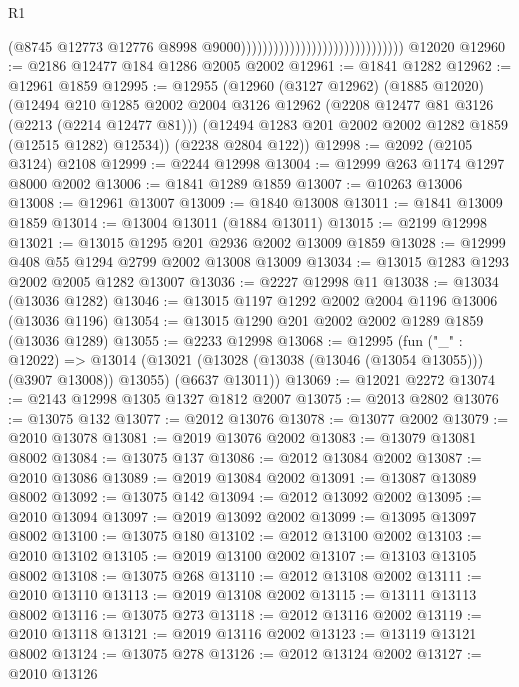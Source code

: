 \begin{lexlean}{R1}
\begin{coremodule}
                                                              (@8745
                                                                @12773
                                                                @12776
                                                                @8998
                                                                @9000))))))))))))))))))))))))))))))
    @12020
@12960 := @2186 @12477 @184 @1286 @2005 @2002
@12961 := @1841 @1282
@12962 := @12961 @1859
@12995 := @12955
    (@12960
      (@3127 @12962)
      (@1885 @12020)
      (@12494
        @210
        @1285
        @2002
        @2004
        @3126
        @12962
        (@2208 @12477 @81 @3126 (@2213 (@2214 @12477 @81)))
        (@12494 @1283 @201 @2002 @2002 @1282 @1859 (@12515 @1282) @12534))
      (@2238 @2804 @122))
@12998 := @2092 (@2105 @3124) @2108
@12999 := @2244 @12998
@13004 := @12999 @263 @1174 @1297 @8000 @2002
@13006 := @1841 @1289 @1859
@13007 := @10263 @13006
@13008 := @12961 @13007
@13009 := @1840 @13008
@13011 := @1841 @13009 @1859
@13014 := @13004 @13011 (@1884 @13011)
@13015 := @2199 @12998
@13021 := @13015 @1295 @201 @2936 @2002 @13009 @1859
@13028 := @12999 @408 @55 @1294 @2799 @2002 @13008 @13009
@13034 := @13015 @1283 @1293 @2002 @2005 @1282 @13007
@13036 := @2227 @12998 @11
@13038 := @13034 (@13036 @1282)
@13046 := @13015 @1197 @1292 @2002 @2004 @1196 @13006 (@13036 @1196)
@13054 := @13015 @1290 @201 @2002 @2002 @1289 @1859 (@13036 @1289)
@13055 := @2233 @12998
@13068 := @12995
    (fun ("_" : @12022) =>
    @13014 (@13021 (@13028 (@13038 (@13046 (@13054 @13055))) (@3907 @13008)) @13055) (@6637 @13011))
@13069 := @12021 @2272
@13074 := @2143 @12998 @1305 @1327 @1812 @2007
@13075 := @2013 @2802
@13076 := @13075 @132
@13077 := @2012 @13076
@13078 := @13077 @2002
@13079 := @2010 @13078
@13081 := @2019 @13076 @2002
@13083 := @13079 @13081 @8002
@13084 := @13075 @137
@13086 := @2012 @13084 @2002
@13087 := @2010 @13086
@13089 := @2019 @13084 @2002
@13091 := @13087 @13089 @8002
@13092 := @13075 @142
@13094 := @2012 @13092 @2002
@13095 := @2010 @13094
@13097 := @2019 @13092 @2002
@13099 := @13095 @13097 @8002
@13100 := @13075 @180
@13102 := @2012 @13100 @2002
@13103 := @2010 @13102
@13105 := @2019 @13100 @2002
@13107 := @13103 @13105 @8002
@13108 := @13075 @268
@13110 := @2012 @13108 @2002
@13111 := @2010 @13110
@13113 := @2019 @13108 @2002
@13115 := @13111 @13113 @8002
@13116 := @13075 @273
@13118 := @2012 @13116 @2002
@13119 := @2010 @13118
@13121 := @2019 @13116 @2002
@13123 := @13119 @13121 @8002
@13124 := @13075 @278
@13126 := @2012 @13124 @2002
@13127 := @2010 @13126

\end{coremodule}
\end{lexlean}
